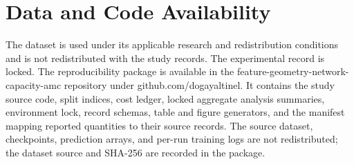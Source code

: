 \section{Data and Code Availability}
The dataset is used under its applicable research and redistribution conditions
and is not redistributed with the study records. The experimental record is
locked. The reproducibility package is available in the
feature-geometry-network-capacity-amc repository under
github.com/dogayaltinel. It contains the study source
code, split indices, cost ledger, locked aggregate analysis summaries,
environment lock, record schemas, table and figure generators, and the
manifest mapping reported quantities to their source records. The source
dataset, checkpoints, prediction arrays, and per-run training logs are not
redistributed; the dataset source and SHA-256 are recorded in the package.
